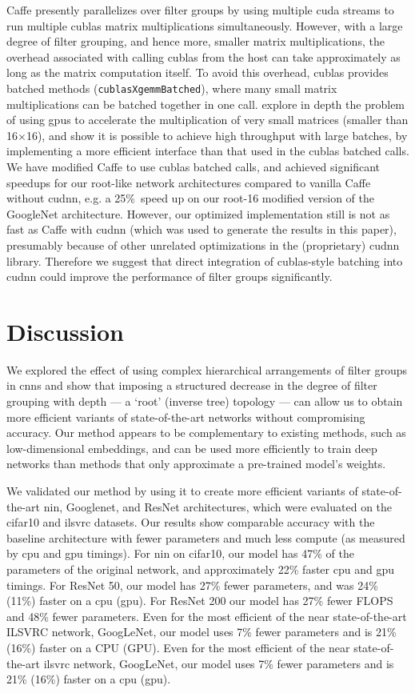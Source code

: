 \documentclass[thesis]{subfiles}
\begin{document}
	Caffe presently parallelizes over filter groups by using multiple \gls{cuda} streams to run multiple \gls{cublas} matrix multiplications simultaneously. However, with a large degree of filter grouping, and hence more, smaller matrix multiplications, the overhead associated with calling \gls{cublas} from the host can take approximately as long as the matrix computation itself. To avoid this overhead, \gls{cublas} provides batched methods (\eg \texttt{cublasXgemmBatched}), where many small matrix multiplications can be batched together in one call. \citet{Jhurani2015} explore in depth the problem of using \gls{gpu}s to accelerate the multiplication of very small matrices (smaller than 16$\times$16), and show it is possible to achieve high throughput with large batches, by implementing a more efficient interface than that used in the \gls{cublas} batched calls.
	We have modified Caffe to use \gls{cublas} batched calls, and achieved significant speedups for our  root-like network architectures compared to vanilla Caffe without \gls{cudnn}, e.g. a 25\%\ speed up on our root-16 modified version of the GoogleNet architecture. However, our optimized implementation still is not as fast as Caffe with \gls{cudnn} (which was used to generate the results in this paper), presumably because of other unrelated optimizations in the (proprietary) \gls{cudnn} library. Therefore we suggest that direct integration of \gls{cublas}-style batching into \gls{cudnn} could improve the performance of filter groups significantly.
	
	\section{Discussion}
	We explored the effect of using complex hierarchical arrangements of filter groups in \glspl{cnn} and show that imposing a structured decrease in the degree of filter grouping with depth --- a `root' (inverse tree) topology --- can allow us to obtain more efficient variants of state-of-the-art networks without compromising accuracy. Our method appears to be complementary to existing methods, such as low-dimensional embeddings, and can be used more efficiently to train deep networks than methods that only approximate a pre-trained model's weights.
	
	We validated our method by using it to create more efficient variants of state-of-the-art \gls{nin}, Googlenet, and ResNet architectures, which were evaluated on the \gls{cifar10} and \gls{ilsvrc} datasets. Our results show comparable accuracy with the baseline architecture with fewer parameters and much less compute (as measured by \gls{cpu} and \gls{gpu} timings). For \gls{nin} on \gls{cifar10}, our model has 47\% of the parameters of the original network, and approximately 22\% faster \gls{cpu} and \gls{gpu} timings. For ResNet 50, our model has 27\% fewer parameters, and was 24\% (11\%) faster on a \gls{cpu} (\gls{gpu}).  For ResNet 200 our model has 27\% fewer FLOPS and 48\% fewer parameters. Even for the most efficient of the near state-of-the-art ILSVRC network, GoogLeNet, our model uses 7\% fewer parameters and is 21\% (16\%) faster on a CPU (GPU). Even for the most efficient of the near state-of-the-art \gls{ilsvrc} network, GoogLeNet, our model uses 7\% fewer parameters and is 21\% (16\%) faster on a \gls{cpu} (\gls{gpu}).
\end{document}
